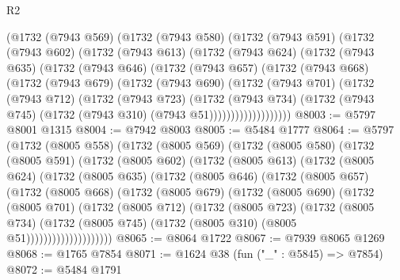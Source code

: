 \begin{lexlean}{R2}
\begin{coremodule}
    (@1732
      (@7943 @569)
      (@1732
        (@7943 @580)
        (@1732
          (@7943 @591)
          (@1732
            (@7943 @602)
            (@1732
              (@7943 @613)
              (@1732
                (@7943 @624)
                (@1732
                  (@7943 @635)
                  (@1732
                    (@7943 @646)
                    (@1732
                      (@7943 @657)
                      (@1732
                        (@7943 @668)
                        (@1732
                          (@7943 @679)
                          (@1732
                            (@7943 @690)
                            (@1732
                              (@7943 @701)
                              (@1732
                                (@7943 @712)
                                (@1732
                                  (@7943 @723)
                                  (@1732
                                    (@7943 @734)
                                    (@1732
                                      (@7943 @745)
                                      (@1732 (@7943 @310) (@7943 @51)))))))))))))))))))
@8003 := @5797 @8001 @1315
@8004 := @7942 @8003
@8005 := @5484 @1777
@8064 := @5797
    (@1732
      (@8005 @558)
      (@1732
        (@8005 @569)
        (@1732
          (@8005 @580)
          (@1732
            (@8005 @591)
            (@1732
              (@8005 @602)
              (@1732
                (@8005 @613)
                (@1732
                  (@8005 @624)
                  (@1732
                    (@8005 @635)
                    (@1732
                      (@8005 @646)
                      (@1732
                        (@8005 @657)
                        (@1732
                          (@8005 @668)
                          (@1732
                            (@8005 @679)
                            (@1732
                              (@8005 @690)
                              (@1732
                                (@8005 @701)
                                (@1732
                                  (@8005 @712)
                                  (@1732
                                    (@8005 @723)
                                    (@1732
                                      (@8005 @734)
                                      (@1732
                                        (@8005 @745)
                                        (@1732 (@8005 @310) (@8005 @51))))))))))))))))))))
@8065 := @8064 @1722
@8067 := @7939 @8065 @1269
@8068 := @1765 @7854
@8071 := @1624 @38 (fun ("_" : @5845) => @7854)
@8072 := @5484 @1791

\end{coremodule}
\end{lexlean}
